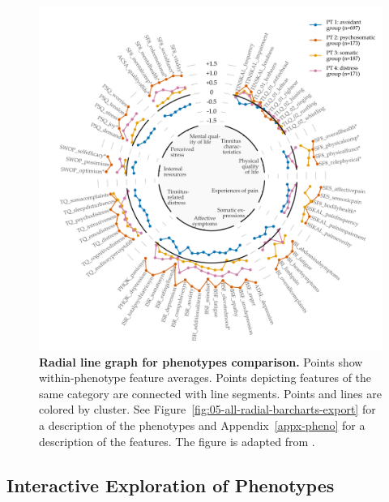 \documentclass[
  oneside]{book}
\begin{document}
\begin{figure}[htb]

{\centering \includegraphics[width=1\linewidth]{figures/05-radar} 

}

\caption{\textbf{Radial line graph for phenotypes comparison.} Points show within-phenotype feature averages. Points depicting features of the same category are connected with line segments. Points and lines are colored by cluster. See Figure~\ref{fig:05-all-radial-barcharts-export} for a description of the phenotypes and Appendix~\ref{appx-pheno} for a description of the features. The figure is adapted from \autocite{Niemann:SREP_Pheno2020}.}\label{fig:05-radar}
\end{figure}

\hypertarget{phenotypes-phenotyping-app}{%
\subsection{Interactive Exploration of Phenotypes}\label{phenotypes-phenotyping-app}}
\end{document}
